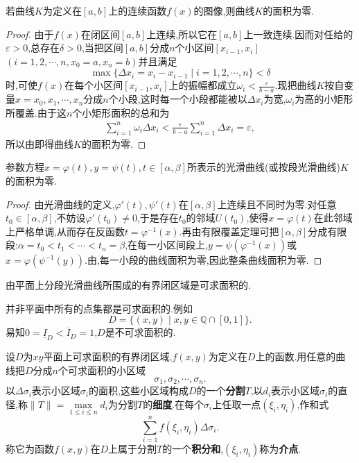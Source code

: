 \documentclass[../../main.tex]{subfiles}%
\begin{document}
\begin{theorem}\label{theorem:数分--定理21.3}
若曲线$K$为定义在$[a,b]$上的连续函数$f(x)$的图像,则曲线$K$的面积为零.
\end{theorem}
\begin{proof}
由于$f(x)$在闭区间$[a,b]$上连续,所以它在$[a,b]$上一致连续.因而对任给的$\varepsilon > 0$,总存在$\delta > 0$,当把区间$[a,b]$分成$n$个小区间$[x_{i-1},x_i]$ $(i = 1,2,\cdots,n,x_0 = a,x_n = b)$并且满足
\[
\max\{ \Delta x_i = x_i - x_{i-1} \mid i = 1,2,\cdots,n \} < \delta
\]
时,可使$f(x)$在每个小区间$[x_{i-1},x_i]$上的振幅都成立$\omega_i < \frac{\varepsilon}{b - a}$.现把曲线$K$按自变量$x = x_0,x_1,\cdots,x_n$分成$n$个小段,这时每一个小段都能被以$\Delta x_i$为宽,$\omega_i$为高的小矩形所覆盖.由于这$n$个小矩形面积的总和为
\begin{align*}
\sum_{i=1}^n \omega_i \Delta x_i < \frac{\varepsilon}{b - a} \sum_{i=1}^n \Delta x_i = \varepsilon,
\end{align*}
所以由即得曲线$K$的面积为零.
\end{proof}

\begin{corollary}
参数方程$x = \varphi(t),y = \psi(t),t \in [\alpha,\beta]$所表示的光滑曲线(或按段光滑曲线)$K$的面积为零.
\end{corollary}
\begin{proof}
由光滑曲线的定义,$\varphi'(t),\psi'(t)$在$[\alpha,\beta]$上连续且不同时为零.对任意$t_0 \in [\alpha,\beta]$,不妨设$\varphi'(t_0) \neq 0$,于是存在$t_0$的邻域$U(t_0)$,使得$x = \varphi(t)$在此邻域上严格单调,从而存在反函数$t = \varphi^{-1}(x)$.再由有限覆盖定理可把$[\alpha,\beta]$分成有限段:$\alpha = t_0 < t_1 < \cdots < t_n = \beta$,在每一小区间段上,$y = \psi(\varphi^{-1}(x))$或$x = \varphi(\psi^{-1}(y))$.由,每一小段的曲线面积为零,因此整条曲线面积为零.
\end{proof}

\begin{corollary}
由平面上分段光滑曲线所围成的有界闭区域是可求面积的.
\end{corollary}
\begin{remark}
并非平面中所有的点集都是可求面积的.例如
\[
D = \{ (x,y) \mid x,y \in \mathbb{Q} \cap [0,1] \}.
\]
易知$0 = \underline{I}_D < \overline{I}_D = 1$,$D$是不可求面积的.
\end{remark}

\begin{definition}
设$D$为$xy$平面上可求面积的有界闭区域,$f(x,y)$为定义在$D$上的函数.用任意的曲线把$D$分成$n$个可求面积的小区域
\[
\sigma_1,\sigma_2,\cdots,\sigma_n.
\]
以$\Delta \sigma_i$表示小区域$\sigma_i$的面积,这些小区域构成$D$的一个\textbf{分割}$T$,以$d_i$表示小区域$\sigma_i$的直径,称$\| T \| = \max\limits_{1 \leqslant i \leqslant n} d_i$为分割$T$的\textbf{细度}.在每个$\sigma_i$上任取一点$(\xi_i,\eta_i)$,作和式
\[
\sum_{i=1}^n f(\xi_i,\eta_i)\Delta \sigma_i.
\]
称它为函数$f(x,y)$在$D$上属于分割$T$的一个\textbf{积分和},$(\xi_i,\eta_i)$称为\textbf{介点}.
\end{definition}
\end{document}
